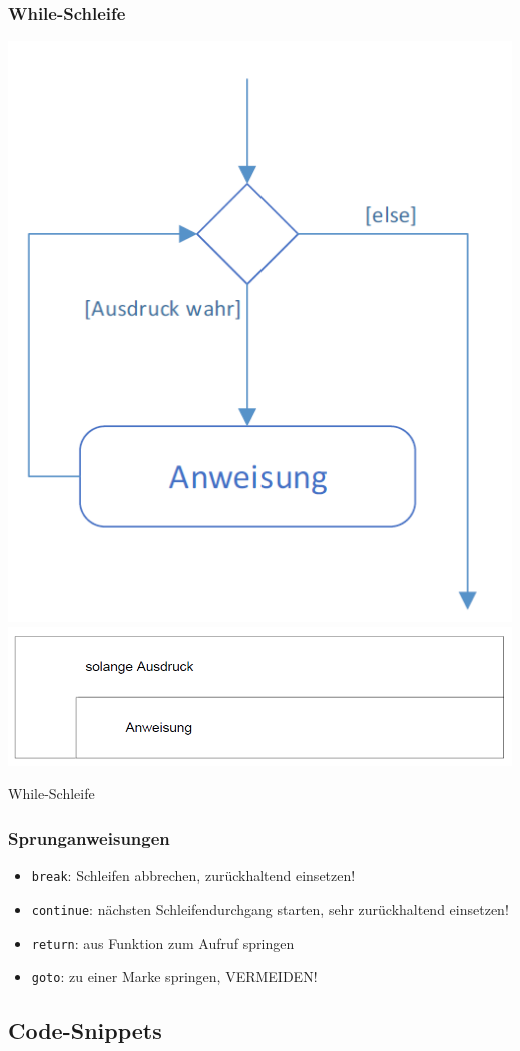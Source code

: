 		\subsubsection{While-Schleife}
			\begin{minipage}{.45\linewidth}
				\includegraphics[width=0.5\linewidth]{Bilder/while1.png}
				\includegraphics[width=0.5\linewidth]{Bilder/while2.png}
			\end{minipage}
			\hfill
			\begin{minipage}{.5\linewidth}
				While-Schleife
			\end{minipage}

		\subsubsection{Sprunganweisungen}
			\begin{itemize}
				\item \verb|break|: Schleifen abbrechen, zurückhaltend einsetzen!
				\item \verb|continue|: nächsten Schleifendurchgang starten, sehr zurückhaltend einsetzen!
				\item \verb|return|: aus Funktion zum Aufruf springen
				\item \verb|goto|: zu einer Marke springen, VERMEIDEN!
			\end{itemize}

	\subsection{Code-Snippets}
